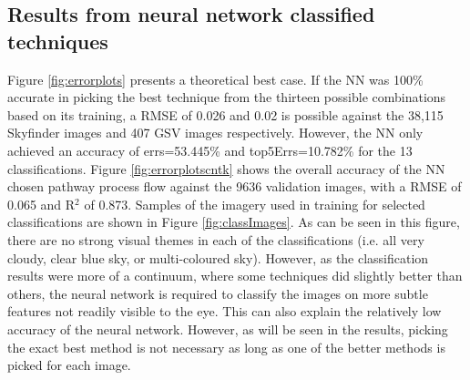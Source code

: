 \documentclass[final,3p,times,authoryear]{elsarticle}
\begin{document}
\subsection{Results from neural network classified techniques}\label{sec:resultsnn}
Figure \ref{fig:errorplots} presents a theoretical best case. If the NN was 100\% accurate in picking the best technique from the thirteen possible combinations based on its training, a RMSE of 0.026 and 0.02 is possible against the 38,115 Skyfinder images and 407 GSV images respectively. However, the NN only achieved an accuracy of errs=53.445\% and top5Errs=10.782\% for the 13 classifications. Figure \ref{fig:errorplotscntk} shows the overall accuracy of the NN chosen pathway process flow against the 9636 validation images, with a RMSE of 0.065 and R$^{2}$ of 0.873. Samples of the imagery used in training for selected classifications are shown in Figure \ref{fig:classImages}. As can be seen in this figure, there are no strong visual themes in each of the classifications (i.e. all very cloudy, clear blue sky, or multi-coloured sky). However, as the classification results were more of a continuum, where some techniques did slightly better than others, the neural network is required to classify the images on more subtle features not readily visible to the eye. This can also explain the relatively low accuracy of the neural network. However, as will be seen in the results, picking the exact best method is not necessary as long as one of the better methods is picked for each image.
\end{document}
